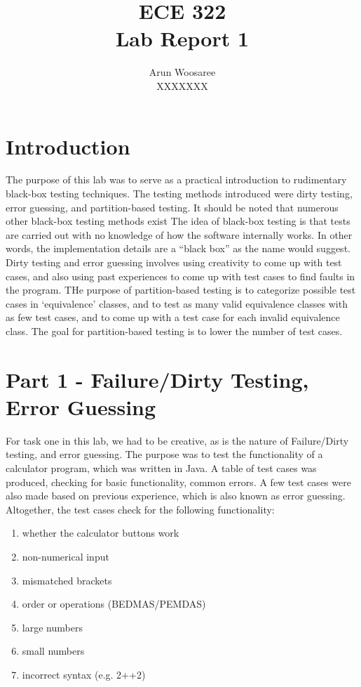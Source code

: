 \documentclass[letterpaper]{article}
\title{ECE 322 \\
Lab Report 1}
\author{Arun Woosaree\\
XXXXXXX}
\begin{document}
\maketitle

\section*{Introduction}
The purpose of this lab was to serve as a practical introduction to rudimentary black-box testing techniques.
The testing methods introduced were dirty testing, error guessing, and partition-based testing.
It should be noted that numerous other black-box testing methods exist
The idea of black-box testing is that tests are carried out with no knowledge of how the software
internally works. In other words, the implementation details are a ``black box'' as the name would suggest.
Dirty testing and error guessing involves using creativity to come up with test cases,
and also using past experiences to come up with test cases to find faults in the program.
THe purpose of partition-based testing is to categorize possible test cases in `equivalence'
classes, and to test as many valid equivalence classes with as few test cases, and to come up
with a test case for each invalid equivalence class. The goal for partition-based testing
is to lower the number of test cases.

\section*{Part 1 - Failure/Dirty Testing, Error Guessing}
For task one in this lab, we had to be creative, as is the nature of Failure/Dirty testing, and error guessing.
The purpose was to test the functionality of a calculator program, which was written in Java. A table of
test cases was produced, checking for basic functionality, common errors. A few test cases were also
made based on previous experience, which is also known as error guessing. Altogether, the test cases check
for the following functionality:

\begin{enumerate}
    \item whether the calculator buttons work
    \item non-numerical input
    \item mismatched brackets
    \item order or operations (BEDMAS/PEMDAS)
    \item large numbers
    \item small numbers
    \item incorrect syntax (e.g. 2++2)
\end{enumerate}
\end{document}
